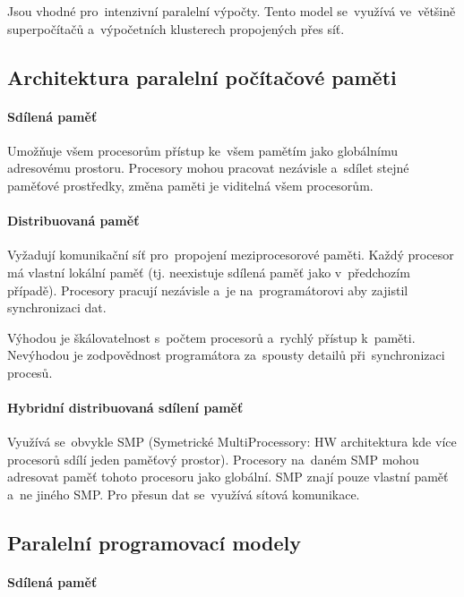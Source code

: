 Jsou vhodné pro~intenzivní paralelní výpočty. Tento model se~využívá ve~většině superpočítačů a~výpočetních klusterech propojených přes síť.

\subsection{Architektura paralelní počítačové paměti}

\paragraph{Sdílená paměť}

Umožňuje všem procesorům přístup ke~všem pamětím jako globálnímu adresovému prostoru. Procesory mohou pracovat nezávisle a~sdílet stejné paměťové prostředky, změna paměti je viditelná všem procesorům.

\paragraph{Distribuovaná paměť}

Vyžadují komunikační síť pro~propojení meziprocesorové paměti. Každý procesor má vlastní lokální paměť (tj. neexistuje sdílená paměť jako v~předchozím případě). Procesory pracují nezávisle a~je na~programátorovi aby zajistil synchronizaci dat.

Výhodou je škálovatelnost s~počtem procesorů a~rychlý přístup k~paměti. Nevýhodou je zodpovědnost programátora za~spousty detailů při~synchronizaci procesů.

\paragraph{Hybridní distribuovaná sdílení paměť}

Využívá se~obvykle SMP (Symetrické MultiProcessory: HW architektura kde více procesorů sdílí jeden paměťový prostor). Procesory na~daném SMP mohou adresovat paměť tohoto procesoru jako globální. SMP znají pouze vlastní paměť a~ne jiného SMP. Pro přesun dat se~využívá sítová komunikace.

\subsection{Paralelní programovací modely}

\paragraph{Sdílená paměť}

